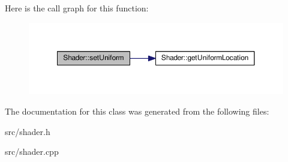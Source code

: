 Here is the call graph for this function\+:\nopagebreak
\begin{figure}[H]
\begin{center}
\leavevmode
\includegraphics[width=350pt]{class_shader_a71a0f88dafffbb3c3f0829e7a8c77abc_cgraph}
\end{center}
\end{figure}




The documentation for this class was generated from the following files\+:\begin{DoxyCompactItemize}
\item 
src/shader.\+h\item 
src/shader.\+cpp\end{DoxyCompactItemize}

